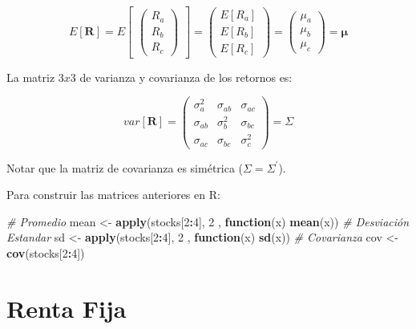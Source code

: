 \documentclass[12pt,]{book}
\newenvironment{Shaded}{\begin{snugshade}}{\end{snugshade}}
\newcommand{\KeywordTok}[1]{\textcolor[rgb]{0.13,0.29,0.53}{\textbf{#1}}}
\newcommand{\DecValTok}[1]{\textcolor[rgb]{0.00,0.00,0.81}{#1}}
\newcommand{\StringTok}[1]{\textcolor[rgb]{0.31,0.60,0.02}{#1}}
\newcommand{\CommentTok}[1]{\textcolor[rgb]{0.56,0.35,0.01}{\textit{#1}}}
\newcommand{\ControlFlowTok}[1]{\textcolor[rgb]{0.13,0.29,0.53}{\textbf{#1}}}
\newcommand{\OperatorTok}[1]{\textcolor[rgb]{0.81,0.36,0.00}{\textbf{#1}}}
\newcommand{\NormalTok}[1]{#1}
\begin{document}
\[
E[\mathbf{R}] = E 
\begin{bmatrix} 
\begin{pmatrix}
    R_{a}  \\
    R_{b}  \\
    R_{c} 
\end{pmatrix}
\end{bmatrix}
    = 
\begin{pmatrix}
  E[R_{a}]  \\
  E[R_{b}]  \\
  E[R_{c}] 
\end{pmatrix}
    =
\begin{pmatrix}
    \mu_{a}  \\
    \mu_{b}  \\
    \mu_{c} 
\end{pmatrix}
    =
\mathbf{\mu}
\]

La matriz \(3x3\) de varianza y covarianza de los retornos es:

\[
var[\mathbf{R}] = 
\begin{pmatrix}
    \sigma^2_{a} & \sigma_{ab}  & \sigma_{ac} \\
    \sigma_{ab}  & \sigma^2_{b} & \sigma_{bc} \\
    \sigma_{ac}  & \sigma_{bc}  &  \sigma^2_{c}  
\end{pmatrix}
    =
\Sigma
\]

Notar que la matriz de covarianza es simétrica
(\(\Sigma = \Sigma^{'}\)).

Para construir las matrices anteriores en R:

\begin{Shaded}
\begin{Highlighting}[]
\CommentTok{# Promedio}
\NormalTok{mean <-}\StringTok{ }\KeywordTok{apply}\NormalTok{(stocks[}\DecValTok{2}\OperatorTok{:}\DecValTok{4}\NormalTok{], }\DecValTok{2}\NormalTok{ , }\ControlFlowTok{function}\NormalTok{(x) }\KeywordTok{mean}\NormalTok{(x)) }
\CommentTok{# Desviación Estandar}
\NormalTok{sd   <-}\StringTok{ }\KeywordTok{apply}\NormalTok{(stocks[}\DecValTok{2}\OperatorTok{:}\DecValTok{4}\NormalTok{], }\DecValTok{2}\NormalTok{ , }\ControlFlowTok{function}\NormalTok{(x) }\KeywordTok{sd}\NormalTok{(x))}
\CommentTok{# Covarianza}
\NormalTok{cov  <-}\StringTok{ }\KeywordTok{cov}\NormalTok{(stocks[}\DecValTok{2}\OperatorTok{:}\DecValTok{4}\NormalTok{])   }
\end{Highlighting}
\end{Shaded}

\chapter{Renta Fija}\label{bonos}
\end{document}
